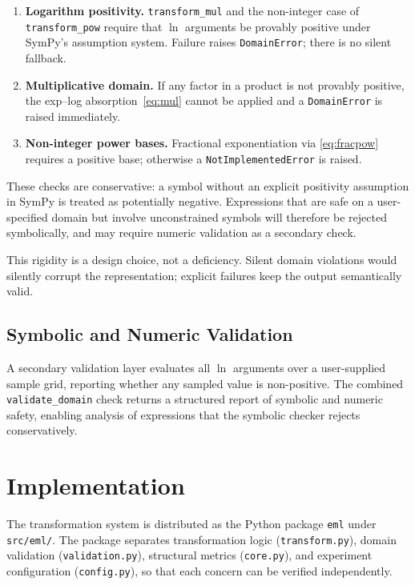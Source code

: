 \documentclass[11pt,a4paper]{article}
\newcommand{\lnf}{\operatorname{ln}}
\begin{document}
\begin{enumerate}
  \item \textbf{Logarithm positivity.} \texttt{transform\_mul} and the
        non-integer case of \texttt{transform\_pow} require that $\lnf$
        arguments be provably positive under SymPy's assumption system.
        Failure raises \texttt{DomainError}; there is no silent fallback.
  \item \textbf{Multiplicative domain.} If any factor in a product is not
        provably positive, the exp--log absorption~\eqref{eq:mul} cannot
        be applied and a \texttt{DomainError} is raised immediately.
  \item \textbf{Non-integer power bases.} Fractional exponentiation via
        \eqref{eq:fracpow} requires a positive base; otherwise a
        \texttt{NotImplementedError} is raised.
\end{enumerate}

These checks are conservative: a symbol without an explicit positivity
assumption in SymPy is treated as potentially negative. Expressions that
are safe on a user-specified domain but involve unconstrained symbols will
therefore be rejected symbolically, and may require numeric validation as
a secondary check.

This rigidity is a design choice, not a deficiency. Silent domain
violations would silently corrupt the representation; explicit failures
keep the output semantically valid.

\subsection{Symbolic and Numeric Validation}

A secondary validation layer evaluates all $\lnf$ arguments over a
user-supplied sample grid, reporting whether any sampled value is
non-positive. The combined \texttt{validate\_domain} check returns a
structured report of symbolic and numeric safety, enabling analysis of
expressions that the symbolic checker rejects conservatively.

\section{Implementation}
\label{sec:impl}

The transformation system is distributed as the Python package \texttt{eml}
under \texttt{src/eml/}. The package separates transformation logic
(\texttt{transform.py}), domain validation (\texttt{validation.py}),
structural metrics (\texttt{core.py}), and experiment configuration
(\texttt{config.py}), so that each concern can be verified independently.
\end{document}
